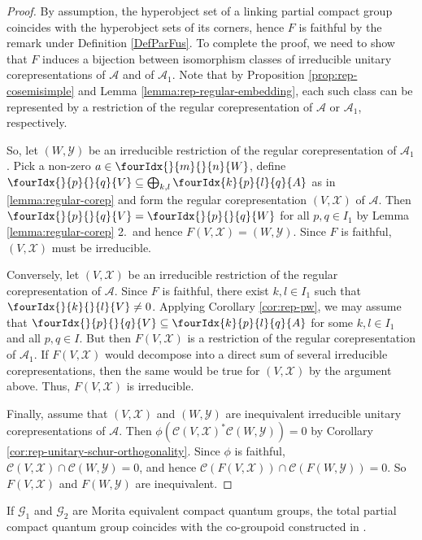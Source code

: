 \documentclass[10pt]{article}
\newcommand{\Gr}[5]{\fourIdx{#2}{#4}{#3}{#5}{#1}}%
\newcommand{\Gru}[3]{\Gr{#1}{}{}{#2}{#3}}
\theoremstyle{definition}
\numberwithin{equation}{section}
\begin{document}
\begin{proof}
By assumption, the hyperobject set of a linking partial compact group coincides with the hyperobject sets of its corners, hence $F$ is faithful by the remark under Definition \ref{DefParFus}.
To complete the proof, we need to show that $F$ induces a
bijection between isomorphism classes of irreducible unitary 
corepresentations of $\mathscr{A}$ and of $\mathscr{A}_{1}$. Note that
by Proposition \ref{prop:rep-cosemisimple} and Lemma
\ref{lemma:rep-regular-embedding}, each such class can be represented
by a restriction of the regular corepresentation of $\mathscr{A}$ or
$\mathscr{A}_{1}$, respectively.

So, let $(W,\mathscr{Y})$ be an irreducible restriction of the regular
corepresentation of $\mathscr{A}_{1}$. Pick a non-zero $a \in
\Gru{W}{m}{n}$, define $\Gru{V}{p}{q} \subseteq \bigoplus_{k,l}
\Gr{A}{k}{l}{p}{q}$ as in \eqref{lemma:regular-corep} and form the
regular corepresentation $(V,\mathscr{X})$ of $\mathscr{A}$. Then
$\Gru{V}{p}{q} = \Gru{W}{p}{q}$ for all $p,q\in I_{1}$ by Lemma
\ref{lemma:regular-corep} 2.\ and hence $F(V,\mathscr{X}) =
(W,\mathscr{Y})$.  Since $F$ is faithful, $(V,\mathscr{X})$ must be
irreducible.

Conversely, let $(V,\mathscr{X})$ be an irreducible restriction of the
regular corepresentation of $\mathscr{A}$. Since $F$ is faithful,
there exist $k,l\in I_{1}$ such that $\Gru{V}{k}{l}\neq 0$. Applying
Corollary \ref{cor:rep-pw}, we may assume that
$\Gru{V}{p}{q} \subseteq \Gr{A}{k}{l}{p}{q}$ for some $k,l\in I_{1}$
and all $p,q\in I$. But then $F(V,\mathscr{X})$ is a restriction of
the regular corepresentation of $\mathscr{A}_{1}$.  If
$F(V,\mathscr{X})$ would decompose into a direct sum of several
irreducible corepresentations, then the same would be true for
$(V,\mathscr{X})$ by the argument above. Thus, $F(V,\mathscr{X})$ is irreducible.

Finally, assume that
$(V,\mathscr{X})$ and $(W,\mathscr{Y})$ are 
inequivalent irreducible unitary corepresentations of $\mathscr{A}$. Then $\phi(\mathcal{C}(V,\mathscr{X})^*\mathcal{C}(W,\mathscr{Y}))=0$ by Corollary \ref{cor:rep-unitary-schur-orthogonality}. Since $\phi$ is faithful, $\mathcal{C}(V,\mathscr{X}) \cap
\mathcal{C}(W,\mathscr{Y})=0$, and hence $\mathcal{C}(F(V,\mathscr{X}))
\cap\mathcal{C}(F(W,\mathscr{Y})) =0$. So $F(V,\mathscr{X})$ and
$F(W,\mathscr{Y})$ are inequivalent.
\end{proof}

If $\mathscr{G}_1$ and $\mathscr{G}_2$ are Morita equivalent compact quantum groups, the total partial compact quantum group coincides with the co-groupoid constructed in \cite{Bic1}. 
\end{document}

